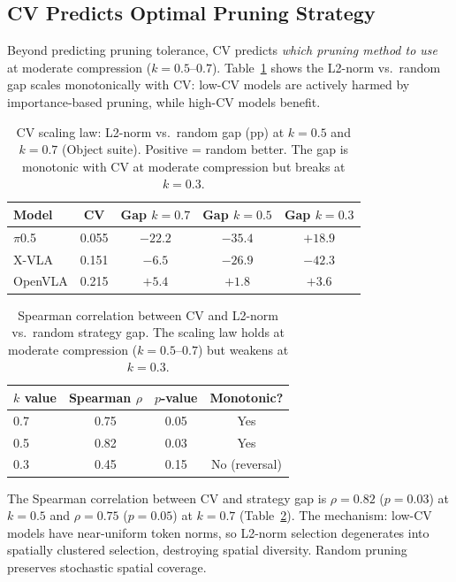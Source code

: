 \documentclass[10pt,twocolumn]{article}
\begin{document}
\subsection{CV Predicts Optimal Pruning Strategy}
\label{sec:cv_scaling}

Beyond predicting pruning tolerance, CV predicts \emph{which pruning method to use} at moderate compression ($k\!=\!0.5$--$0.7$).
Table~\ref{tab:cv_scaling} shows the L2-norm vs.\ random gap scales monotonically with CV: low-CV models are actively harmed by importance-based pruning, while high-CV models benefit.

\begin{table}[t]
\centering
\caption{CV scaling law: L2-norm vs.\ random gap (pp) at $k\!=\!0.5$ and $k\!=\!0.7$ (Object suite). Positive = random better. The gap is monotonic with CV at moderate compression but breaks at $k\!=\!0.3$.}
\label{tab:cv_scaling}
\small
\begin{tabular}{@{}lcccc@{}}
\toprule
Model & CV & Gap $k\!=\!0.7$ & Gap $k\!=\!0.5$ & Gap $k\!=\!0.3$ \\
\midrule
$\pi$0.5 & 0.055 & $-22.2$ & $-35.4$ & $+18.9$ \\
X-VLA & 0.151 & $-6.5$ & $-26.9$ & $-42.3$ \\
OpenVLA & 0.215 & $+5.4$ & $+1.8$ & $+3.6$ \\
\bottomrule
\end{tabular}
\end{table}

\begin{table}[t]
\centering
\caption{Spearman correlation between CV and L2-norm vs.\ random strategy gap. The scaling law holds at moderate compression ($k\!=\!0.5$--$0.7$) but weakens at $k\!=\!0.3$.}
\label{tab:spearman}
\small
\begin{tabular}{@{}lccc@{}}
\toprule
$k$ value & Spearman $\rho$ & $p$-value & Monotonic? \\
\midrule
0.7 & 0.75 & 0.05 & Yes \\
0.5 & 0.82 & 0.03 & Yes \\
0.3 & 0.45 & 0.15 & No (reversal) \\
\bottomrule
\end{tabular}
\end{table}

The Spearman correlation between CV and strategy gap is $\rho=0.82$ ($p=0.03$) at $k\!=\!0.5$ and $\rho=0.75$ ($p=0.05$) at $k\!=\!0.7$ (Table~\ref{tab:spearman}).
The mechanism: low-CV models have near-uniform token norms, so L2-norm selection degenerates into spatially clustered selection, destroying spatial diversity.
Random pruning preserves stochastic spatial coverage.
\end{document}

